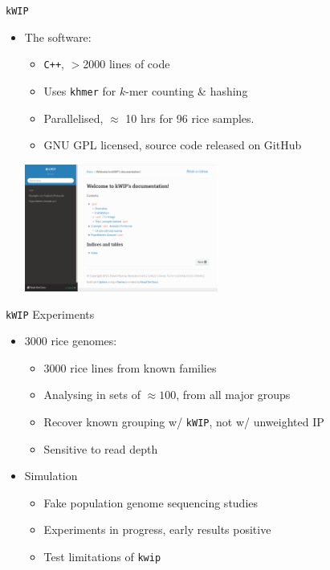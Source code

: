 \documentclass[t]{beamer}
\begin{document}
\begin{frame}{\texttt{kWIP}}
  \begin{itemize} %
    \item The software:
      \begin{itemize}
        \item \texttt{C++}, $>$2000 lines of code
        \item Uses \texttt{khmer} for $k$-mer counting \& hashing
        \item Parallelised, $\approx$ 10 hrs for 96 rice samples.
        \item GNU GPL licensed, source code released on GitHub
      \end{itemize}
      \begin{center}
        \includegraphics[width=0.5\textwidth]{img/kwip-doc-screenshot.png}
      \end{center}
  \end{itemize}
\end{frame}

\begin{frame}{\texttt{kWIP} Experiments}
  \begin{itemize}
    \item 3000 rice genomes:
      \begin{itemize}
        \item 3000 rice lines from known families
        \item Analysing in sets of $\approx 100$, from all major groups
        \item Recover known grouping w/ \texttt{kWIP}, not w/ unweighted IP
        \item Sensitive to read depth
      \end{itemize}
    \item Simulation
      \begin{itemize}
        \item Fake population genome sequencing studies
        \item Experiments in progress, early results positive
        \item Test limitations of \texttt{kwip}
      \end{itemize}
  \end{itemize}
\end{frame}
\end{document}

